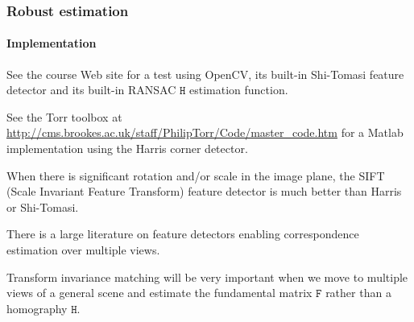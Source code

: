 \documentclass[aspectratio=169]{beamer}
\newcommand{\mat}[1]{\mathtt{#1}}
\begin{document}
\begin{frame}
\frametitle{Robust estimation}
\framesubtitle{Implementation}

See the course Web site for a test using OpenCV, its built-in
\alert{Shi-Tomasi feature detector} and its built-in RANSAC $\mat{H}$
estimation function.

\medskip

See the Torr toolbox at {\small
  \url{http://cms.brookes.ac.uk/staff/PhilipTorr/Code/master_code.htm}}
for a Matlab implementation using the \alert{Harris corner detector}.

\medskip

When there is significant rotation and/or scale in the image plane,
the \alert{SIFT} (Scale Invariant Feature Transform) feature detector is much
better than Harris or Shi-Tomasi.

\medskip

There is a large literature on feature detectors enabling
correspondence estimation over multiple views.

\medskip

Transform invariance matching will be very important when we move to
multiple views of a general scene and estimate the fundamental matrix
$\mat{F}$ rather than a homography $\mat{H}$.

\end{frame}
\end{document}
